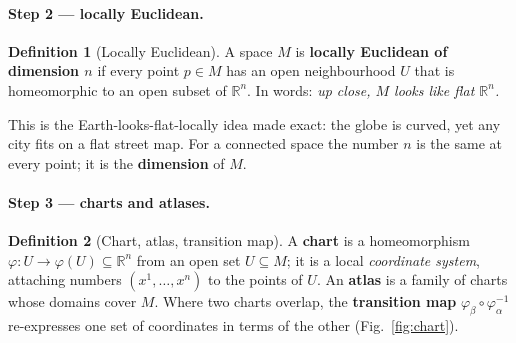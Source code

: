 \documentclass[11pt]{article}
\theoremstyle{definition}
\newtheorem{definition}{Definition}[section]
\theoremstyle{remark}
\newcommand{\R}{\mathbb{R}}
\begin{document}
\paragraph{Step 2 --- locally Euclidean.}
\begin{definition}[Locally Euclidean]
A space $M$ is \textbf{locally Euclidean of dimension $n$} if every point $p\in M$ has an open neighbourhood
$U$ that is homeomorphic to an open subset of $\R^n$. In words: \emph{up close, $M$ looks like flat
$\R^n$.}
\end{definition}
This is the Earth-looks-flat-locally idea made exact: the globe is curved, yet any city fits on a flat
street map. For a connected space the number $n$ is the same at every point; it is the \textbf{dimension}
of $M$.

\paragraph{Step 3 --- charts and atlases.}
\begin{definition}[Chart, atlas, transition map]
A \textbf{chart} is a homeomorphism $\varphi:U\to\varphi(U)\subseteq\R^n$ from an open set $U\subseteq M$;
it is a local \emph{coordinate system}, attaching numbers $(x^1,\dots,x^n)$ to the points of $U$. An
\textbf{atlas} is a family of charts whose domains cover $M$. Where two charts overlap, the
\textbf{transition map} $\varphi_\beta\circ\varphi_\alpha^{-1}$ re-expresses one set of coordinates in
terms of the other (Fig.~\ref{fig:chart}).
\end{definition}
\end{document}
